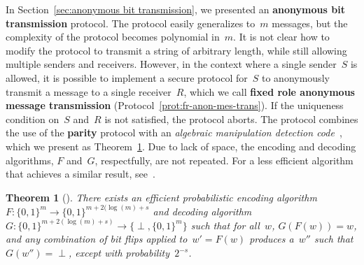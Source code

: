 \documentclass[11pt]{article}
\newtheorem{theorem}{Theorem}[section]
\begin{document}
In Section~\ref{sec:anonymous bit transmission}, we presented an
\textbf{anonymous bit transmission} protocol. The protocol easily
generalizes to~$m$ messages, but the complexity of the protocol
becomes polynomial in~$m$. It is not clear how to modify the
protocol to transmit a string of arbitrary length, while still
allowing multiple senders and receivers. However, in the context
where a single sender~$S$ is allowed, it is possible to implement a
secure protocol for~$S$ to anonymously transmit a message to a
single receiver~$R$, which we call \textbf{fixed role anonymous
message transmission} (Protocol~\ref{prot:fr-anon-mes-trans}). If
the uniqueness condition on~$S$ and~$R$ is not satisfied, the
protocol aborts.  The protocol combines the use of the
\textbf{parity} protocol with an \emph{algebraic manipulation
detection code}~\cite{CFP07}, which we present as
Theorem~\ref{thm:serge}. Due to lack of space, the encoding and
decoding algorithms,  $F$ and~$G$, respectfully, are not repeated.
For a less efficient algorithm that achieves a similar result,
see~\cite{PSV99}.




\begin{theorem}[\cite{CFP07}] \label{thm:serge}
There exists an efficient probabilistic encoding algorithm
$F:\{0,1\}^m \rightarrow \{0,1\}^{m+2(\log(m)+s}$ and decoding
algorithm $G:\{0,1\}^{m+2(\log(m)+s)} \rightarrow
\{\perp,\{0,1\}^m\}$ such that for all~$w$, $G(F(w))=w$, and
any combination of bit
flips applied to~$w'=F(w)$ produces a~$w''$ such that
$G(w'')=\perp$, except with probability~$2^{-s}$.
\end{theorem}
\end{document}
